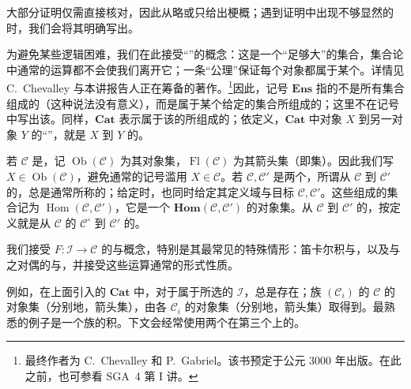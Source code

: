 大部分证明仅需直接核对，因此从略或只给出梗概；遇到证明中出现不够显然的时，我们会将其明确写出。

为避免某些逻辑困难，我们在此接受“”的概念：这是一个“足够大”的集合，集合论中通常的运算都不会使我们离开它；一条“公理”保证每个对象都属于某个。详情见 C.~Chevalley 与本讲报告人正在筹备的著作。\footnote{最终作者为 C.~Chevalley 和 P.~Gabriel。该书预定于公元 3000 年出版。在此之前，也可参看 SGA~4 第 I 讲。}因此，记号 $\mathbf{Ens}$ 指的不是所有集合组成的（这种说法没有意义），而是属于某个给定的集合所组成的；这里不在记号中写出该。同样，$\mathbf{Cat}$ 表示属于该的所组成的；依定义，$\mathbf{Cat}$ 中对象 $X$ 到另一对象 $Y$ 的“”，就是 $X$ 到 $Y$ 的。

若 $\mathcal C$ 是，记 $\operatorname{Ob}(\mathcal C)$ 为其对象集，$\operatorname{Fl}(\mathcal C)$ 为其箭头集（即集）。因此我们写 $X\in\operatorname{Ob}(\mathcal C)$，避免通常的记号滥用 $X\in\mathcal C$。若 $\mathcal C,\mathcal C'$ 是两个，所谓从 $\mathcal C$ 到 $\mathcal C'$ 的，总是通常所称的；给定时，也同时给定其定义域与目标 $\mathcal C,\mathcal C'$。这些组成的集合记为 $\operatorname{Hom}(\mathcal C,\mathcal C')$，它是一个 $\mathbf{Hom}(\mathcal C,\mathcal C')$ 的对象集。从 $\mathcal C$ 到 $\mathcal C'$ 的，按定义就是从 $\mathcal C$ 的 $\mathcal C^\circ$ 到 $\mathcal C'$ 的。

我们接受 $F:\mathcal I\to\mathcal C$ 的与概念，特别是其最常见的特殊情形：笛卡尔积与，以及与之对偶的与，并接受这些运算通常的形式性质。

例如，在上面引入的 $\mathbf{Cat}$ 中，对于属于所选的 $\mathcal I$，总是存在；族 $(\mathcal C_i)$ 的 $\mathcal C$ 的对象集（分别地，箭头集），由各 $\mathcal C_i$ 的对象集（分别地，箭头集）取得到。最熟悉的例子是一个族的积。下文会经常使用两个在第三个上的。


